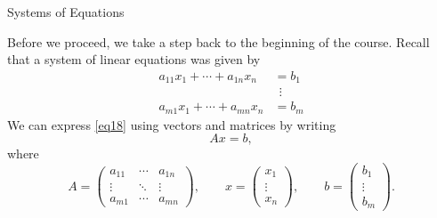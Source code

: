 \documentclass[smaller,hyperref={CJKbookmarks=true}]{beamer}
\begin{document}
\begin{frame}[t]{Systems of Equations}
\begin{spacing}{1}
Before we proceed, we take a step back to the beginning of the course. Recall that a system of linear equations was given by
\begin{equation}\label{eq18}
  \begin{aligned}
    a_{11}x_1+\cdots+a_{1n}x_n &=b_1 \\
     &~~\vdots  \\
    a_{m1}x_1+\cdots+a_{mn}x_n &=b_m
  \end{aligned}
\end{equation}
We can express \eqref{eq18} using vectors and matrices by writing
\[Ax=b,\]
where
\[A=\begin{pmatrix}
      a_{11} & \cdots & a_{1n} \\
      \vdots & \ddots & \vdots \\
      a_{m1} & \cdots & a_{mn}
    \end{pmatrix},\qquad x=\begin{pmatrix}
                             x_1 \\
                             \vdots \\
                             x_n
                           \end{pmatrix},\qquad b=\begin{pmatrix}
                               b_1 \\
                               \vdots \\
                               b_m
                             \end{pmatrix}.\]
\end{spacing}
\end{frame}
\end{document}
